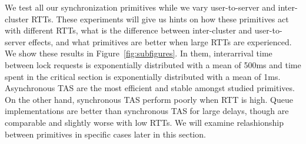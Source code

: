 We test all our synchronization primitives while we vary user-to-server and inter-cluster RTTs. These experiments will give us hints on how these primitives act with different RTTs, what is the difference between inter-cluster and user-to-server effects, and what primitives are better when large RTTs are experienced. We show these results in Figure~\ref{fig:subfigures}. In them, interarrival time between lock requests is exponentially distributed with a mean of 500ms and time spent in the critical section is exponentially distributed with a mean of 1ms. Asynchronous TAS are the most efficient and stable amongst studied primitives. On the other hand, synchronous TAS perform poorly when RTT is high. Queue implementations are better than synchronous TAS for large delays, though are comparable and slightly worse with low RTTs. We will examine relashionship between primitives in specific cases later in this section. 


















